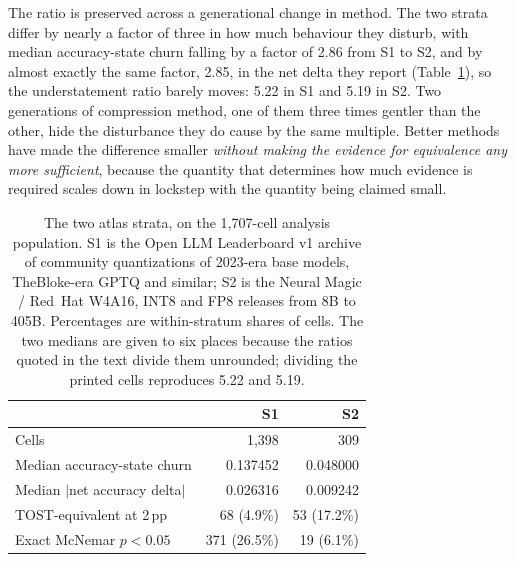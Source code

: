 The ratio is preserved across a generational change in method. The two strata
differ by nearly a factor of three in how much behaviour they disturb, with
median accuracy-state churn falling by a factor of 2.86 from S1 to S2, and by
almost exactly the same factor, 2.85, in the net delta they report
(Table~\ref{tab:atlas-strata}), so the understatement ratio barely moves: 5.22
in S1 and 5.19 in S2. Two generations of
compression method, one of them three times gentler than the other, hide the
disturbance they do cause by the same multiple. Better methods have made the
difference smaller \emph{without making the evidence for equivalence any more
sufficient}, because the quantity that determines how much evidence is required
scales down in lockstep with the quantity being claimed small.

\begin{table}[!t]
\centering
\caption{The two atlas strata, on the 1{,}707-cell analysis population. S1 is
the Open LLM Leaderboard v1 archive of community quantizations of 2023-era base
models, TheBloke-era GPTQ and similar; S2 is the Neural Magic / Red~Hat
W4A16, INT8 and FP8 releases from 8B to 405B. Percentages are within-stratum
shares of cells. The two medians are given to six places because the ratios
quoted in the text divide them unrounded; dividing the printed cells reproduces
5.22 and 5.19.}
\label{tab:atlas-strata}
\begin{tabular}{lrr}
\toprule
 & S1 & S2 \\
\midrule
Cells                                & 1{,}398        & 309 \\
Median accuracy-state churn          & 0.137452       & 0.048000 \\
Median $|$net accuracy delta$|$      & 0.026316       & 0.009242 \\
TOST-equivalent at 2\,pp             & 68 (4.9\%)     & 53 (17.2\%) \\
Exact McNemar $p < 0.05$             & 371 (26.5\%)   & 19 (6.1\%) \\
\bottomrule
\end{tabular}
\end{table}


